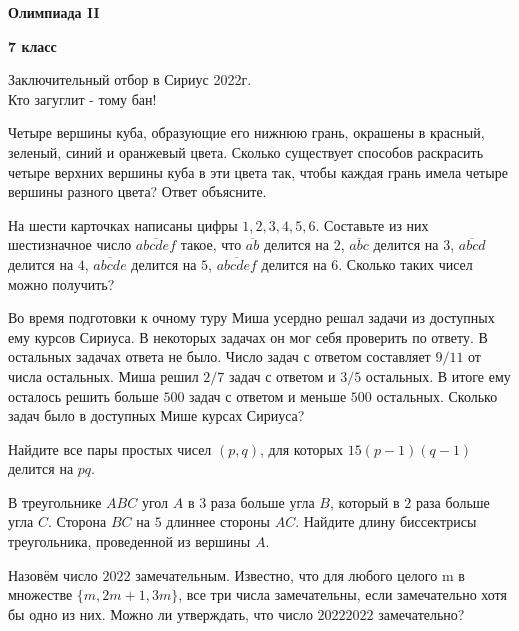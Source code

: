 \centerline{\Huge \bf  Олимпиада II}
\centerline{\Huge \bf 7 класс}

\begin{flushright}
    \scriptsize{Заключительный отбор в Сириус 2022г.\\ Кто загуглит - тому бан!}
\end{flushright}

Четыре вершины куба, образующие его нижнюю грань, окрашены в красный, зеленый, синий и оранжевый цвета. Сколько существует способов раскрасить четыре верхних вершины куба в эти цвета так, чтобы каждая грань имела четыре вершины разного цвета? Ответ объясните.

На шести карточках написаны цифры $1, 2, 3, 4, 5, 6$. Составьте из них шестизначное число $\overline{abcdef}$ такое, что $\overline{ab}$ делится на $2$, $\overline{abc}$ делится на $3$, $\overline{abcd}$ делится на $4$, $\overline{abcde}$ делится на $5$, $\overline{abcdef}$ делится на $6$. Сколько таких чисел можно получить?


Во время подготовки к очному туру Миша усердно решал задачи из доступных ему курсов Сириуса. В некоторых задачах он мог себя проверить по ответу. В остальных задачах ответа не было. Число задач с ответом составляет $9/11$ от числа остальных. Миша решил $2/7$ задач с ответом и $3/5$ остальных. В итоге ему осталось решить больше $500$ задач с ответом и меньше $500$ остальных. Сколько задач было в доступных Мише курсах Сириуса?

Найдите все пары простых чисел $(p, q)$, для которых $15(p - 1)(q - 1)$ делится на $pq$.

В треугольнике $ABC$ угол $A$ в $3$ раза больше угла $B$, который в $2$ раза больше угла $C$. Сторона $BC$ на $5$ длиннее стороны $AC$. Найдите длину биссектрисы треугольника, проведенной из вершины $A$.

Назовём число $2022$ замечательным. Известно, что для любого целого m в множестве $\{m, 2m + 1, 3m\}$, все три числа замечательны, если замечательно хотя бы одно из них. Можно ли утверждать, что число $20222022$ замечательно?